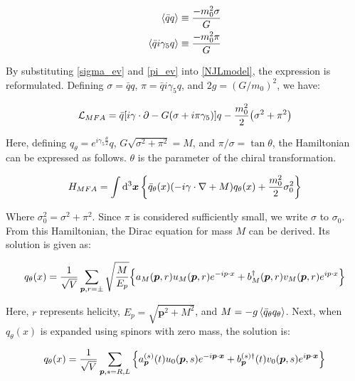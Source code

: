         \begin{eqnarray}
            \label{sigma_ev}
            \ev{\bar{q}q}\equiv \frac{-m_0^2 \sigma}{G}\\
            \label{pi_ev}
            \ev{\bar{q}i\gamma_5q}\equiv \frac{-m_0^2 \pi}{G}
        \end{eqnarray}

        By substituting \eqref{sigma_ev} and \eqref{pi_ev} into \eqref{NJLmodel}, the expression is reformulated. Defining $\sigma = \bar{q}q$, $\pi = \bar{q} i \gamma_5 q$, and $2g = (G/m_0)^2$, we have:  
        
        \begin{eqnarray}
            \label{heikinbago}
            \mathcal{L}_{MFA} = \bar{q}\qty[i \gamma \cdot \partial - G(\sigma + i \pi \gamma_5)]q-\frac{m_0^2}{2}\qty(\sigma^2+\pi^2)
        \end{eqnarray}
        
        Here, defining $q_\theta = e^{i \gamma_5 \frac{\theta}{2}} q$, $G \sqrt{\sigma^2 + \pi^2} = M$, and $\pi / \sigma = \tan{\theta}$, the Hamiltonian can be expressed as follows. $\theta$ is the parameter of the chiral transformation.  

        \begin{eqnarray}
            \label{ham}
            H_{MFA}=\int \dd[3]{\bm{x}}\qty{\bar{q}_\theta (x)(-i\gamma \cdot \nabla+M)q_{\theta}(x)+\frac{m_0^2}{2}\sigma_0^2}
        \end{eqnarray}
        
        Where $\sigma_0^2 = \sigma^2 + \pi^2$. Since $\pi$ is considered sufficiently small, we write $\sigma$ to $\sigma_0$.  
        From this Hamiltonian, the Dirac equation for mass $M$ can be derived. Its solution is given as:  
        
        \begin{eqnarray}
            \label{Msol}
            q_\theta (x)=\frac{1}{\sqrt{V}}\sum_{\bm{p},r=\pm} \sqrt{\frac{M}{E_p}}\qty{a_M(\bm{p},r)u_M(\bm{p},r)e^{-ip\cdot x}+b_M^{\dag}(\bm{p},r)v_M(\bm{p},r)e^{ip\cdot x}}
        \end{eqnarray}

        Here, $r$ represents helicity, $E_p = \sqrt{\bm{p}^2 + M^2}$, and $M = -g\ev{\bar{q}_\theta q_\theta}$.  
        Next, when $q_\theta(x)$ is expanded using spinors with zero mass, the solution is:  

        \begin{eqnarray}
            \label{0sol}
            q_\theta (x)=\frac{1}{\sqrt{V}}\sum_{\bm{p},s=R,L}\qty{a_{\bm{p}}^{(s)}(t)u_0(\bm{p},s)e^{-i\bm{p}\cdot \bm{x}}+b_{\bm{p}}^{(s)\dag}(t)v_0(\bm{p},s)e^{i\bm{p}\cdot \bm{x}}}
        \end{eqnarray}
        
